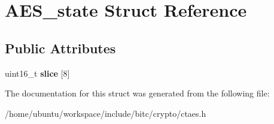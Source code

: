 \hypertarget{structAES__state}{\section{A\-E\-S\-\_\-state Struct Reference}
\label{structAES__state}
}
\subsection*{Public Attributes}
\begin{DoxyCompactItemize}
\item 
\hypertarget{structAES__state_a7cb81fabbdc20b8f9bb7a614981f03c8}{uint16\-\_\-t {\bfseries slice} \mbox{[}8\mbox{]}}\label{structAES__state_a7cb81fabbdc20b8f9bb7a614981f03c8}

\end{DoxyCompactItemize}


The documentation for this struct was generated from the following file\-:\begin{DoxyCompactItemize}
\item 
/home/ubuntu/workspace/include/bitc/crypto/ctaes.\-h\end{DoxyCompactItemize}
